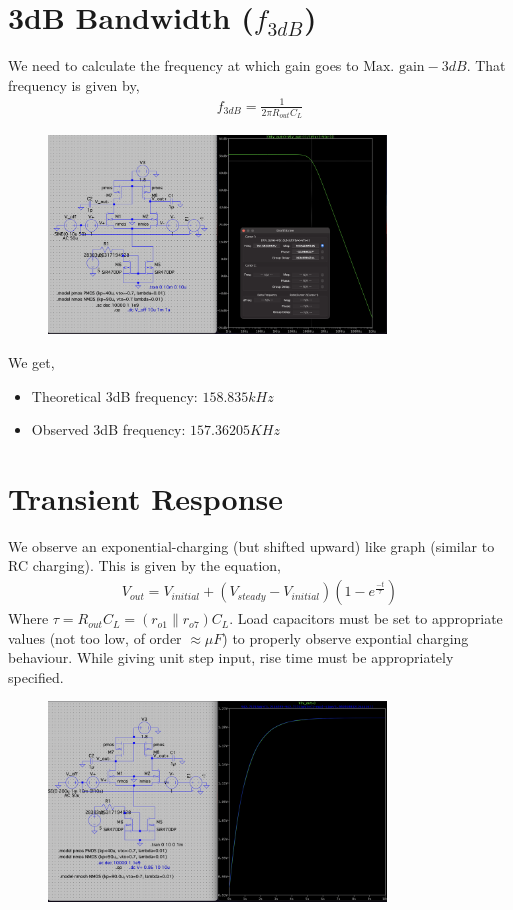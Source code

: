 \documentclass[12pt,a4paper]{article}
\newcommand{\brak}[1]{\ensuremath{\left(#1\right)}}
\providecommand{\brak}[1]{\ensuremath{\left(#1\right)}}
\begin{document}
\section{3dB Bandwidth ($f_{3dB}$)}
We need to calculate the frequency at which gain goes to $\text{Max. gain}-3dB$. That frequency is given by,
\begin{align*}
f_{3dB} = \frac{1}{2 \pi R_{out} C_L}
\end{align*}
\vspace{6pt}
\begin{figure}[H]
    \centering
    \includegraphics[width=0.8\textwidth]{figs/3dB.png}
\end{figure}
We get,
\begin{itemize}
    \item Theoretical 3dB frequency: $158.835kHz$
    \item Observed 3dB frequency: $157.36205KHz$
\end{itemize}

\vspace{10pt}
\section{Transient Response}
We observe an exponential-charging (but shifted upward) like graph (similar to RC charging). This is given by the equation,
\begin{align*}
    V_{out}=V_{initial} + (V_{steady}-V_{initial})\brak{1-e^{\frac{-t}{\tau}}}
\end{align*}
Where $\tau = R_{out} C_L = (r_{o1} \parallel r_{o7}) C_L$. Load capacitors must be set to appropriate values (not too low, of order $\approx \mu F$) to properly observe expontial charging behaviour. While giving unit step input, rise time must be appropriately specified.
\begin{figure}[H]
    \centering
    \includegraphics[width=0.8\textwidth]{figs/transient.png}
\end{figure}
\end{document}
